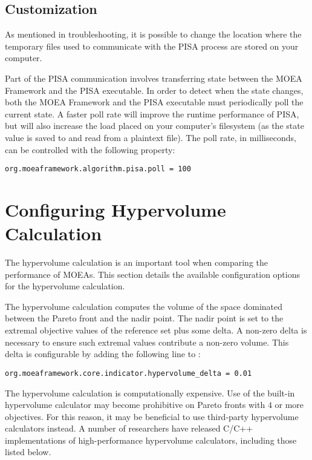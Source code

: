 \subsection{Customization}
As mentioned in troubleshooting, it is possible to change the location where the temporary files used to communicate with the PISA process are stored on your computer.

Part of the PISA communication involves transferring state between the MOEA Framework and the PISA executable.  In order to detect when the state changes, both the MOEA Framework and the PISA executable must periodically poll the current state.  A faster poll rate will improve the runtime performance of PISA, but will also increase the load placed on your computer's filesystem (as the state value is saved to and read from a plaintext file).  The poll rate, in milliseconds, can be controlled with the following property:

\begin{lstlisting}[language=Plaintext]
org.moeaframework.algorithm.pisa.poll = 100
\end{lstlisting}

\section{Configuring Hypervolume Calculation}
The hypervolume calculation is an important tool when comparing the performance of MOEAs.  This section details the available configuration options for the hypervolume calculation.

The hypervolume calculation computes the volume of the space dominated between the Pareto front and the nadir point.  The nadir point is set to the extremal objective values of the reference set plus some delta.  A non-zero delta is necessary to ensure such extremal values contribute a non-zero volume.  This delta is configurable by adding the following line to :

\begin{lstlisting}[language=Plaintext]
org.moeaframework.core.indicator.hypervolume_delta = 0.01
\end{lstlisting}

The hypervolume calculation is computationally expensive.  Use of the built-in hypervolume calculator may become prohibitive on Pareto fronts with $4$ or more objectives.  For this reason, it may be beneficial to use third-party hypervolume calculators instead.  A number of researchers have released C/C++ implementations of high-performance hypervolume calculators, including those listed below.


